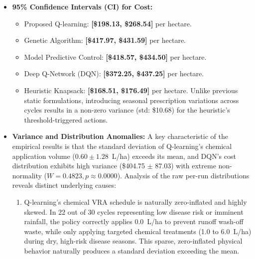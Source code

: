 \documentclass[review,3p,times,authoryear]{elsarticle}
\begin{document}
\begin{itemize}
\begin{itemize}
    \end{itemize}
    \item \textbf{95\% Confidence Intervals (CI) for Cost:}
    \begin{itemize}
        \item Proposed Q-learning: \textbf{[\$198.13, \$268.54]} per hectare.
        \item Genetic Algorithm: \textbf{[\$417.97, \$431.59]} per hectare.
        \item Model Predictive Control: \textbf{[\$418.57, \$434.50]} per hectare.
        \item Deep Q-Network (DQN): \textbf{[\$372.25, \$437.25]} per hectare.
        \item Heuristic Knapsack: \textbf{[\$168.51, \$176.49]} per hectare. Unlike previous static formulations, introducing seasonal prescription variations across cycles results in a non-zero variance (std: \$10.68) for the heuristic's threshold-triggered actions.
    \end{itemize}
    \item \textbf{Variance and Distribution Anomalies:} 
    A key characteristic of the empirical results is that the standard deviation of Q-learning's chemical application volume ($0.60 \pm 1.28$~L/ha) exceeds its mean, and DQN's cost distribution exhibits high variance (\$404.75 $\pm$ 87.03) with extreme non-normality ($W=0.4823, p \approx 0.0000$). 
    Analysis of the raw per-run distributions reveals distinct underlying causes:
    \begin{enumerate}
        \item Q-learning's chemical VRA schedule is naturally zero-inflated and highly skewed. In 22 out of 30 cycles representing low disease risk or imminent rainfall, the policy correctly applies 0.0~L/ha to prevent runoff wash-off waste, while only applying targeted chemical treatments (1.0 to 6.0~L/ha) during dry, high-risk disease seasons. This sparse, zero-inflated physical behavior naturally produces a standard deviation exceeding the mean.

\end{enumerate}
\end{itemize}
\end{document}

